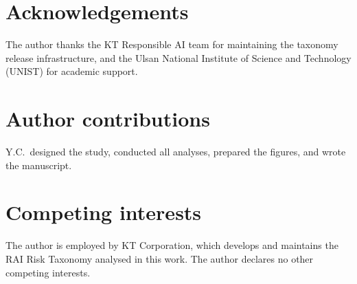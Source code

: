 \documentclass[fleqn,10pt]{wlscirep}
\begin{document}
\section*{Acknowledgements}
The author thanks the KT Responsible AI team for maintaining the taxonomy
release infrastructure, and the Ulsan National Institute of Science and
Technology (UNIST) for academic support.

\section*{Author contributions}
Y.C.\ designed the study, conducted all analyses, prepared the figures, and
wrote the manuscript.

\section*{Competing interests}
The author is employed by KT Corporation, which develops and maintains the
RAI Risk Taxonomy analysed in this work. The author declares no other
competing interests.
\end{document}

